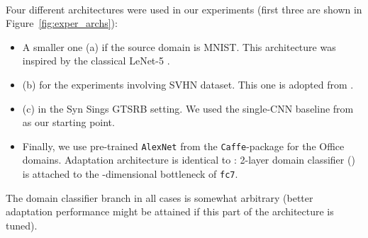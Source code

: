 \documentclass{article}
\newcommand{\fig}[1]{Figure~\ref{fig:#1}}
\begin{document}
\begin{figure*}[t]
{{
 }}\\
\caption{CNN architectures used in the experiments. Boxes correspond to transformations applied to the data. Color-coding is the same as in \fig{arch}.}
  \label{fig:exper_archs}
\end{figure*}

Four different architectures were used in our experiments (first three are shown in \fig{exper_archs}):
\begin{itemize}
  \item A smaller one (a) if the source domain is MNIST. This architecture was inspired by the classical LeNet-5 \cite{LeCun98}.
  \item (b) for the experiments involving SVHN dataset. This one is adopted from \cite{Srivastava14}.
  \item (c) in the {\sc Syn Sings}  {\sc GTSRB} setting. We used the single-CNN baseline from \cite{Cirecsan12} as our starting point.
  \item Finally, we use pre-trained \texttt{AlexNet} from the \texttt{Caffe}-package \cite{Jia14} for the {\sc Office} domains. Adaptation architecture is identical to \cite{Tzeng14}: 2-layer domain classifier () is attached to the -dimensional bottleneck of \texttt{fc7}.  
\end{itemize}
The domain classifier branch in all cases is somewhat arbitrary (better adaptation performance might be attained if this part of the architecture is tuned).
\end{document}
